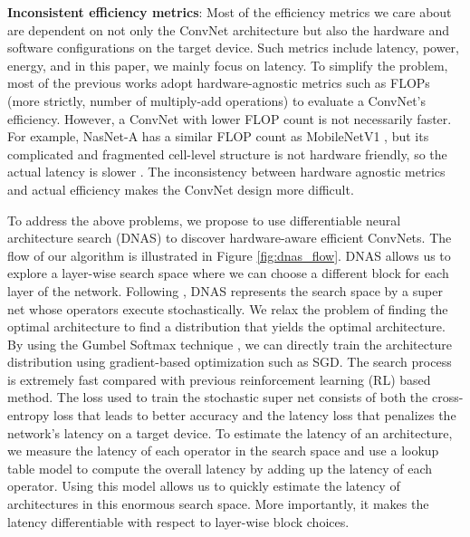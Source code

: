 \documentclass[10pt,twocolumn,letterpaper]{article}
\begin{document}
\textbf{Inconsistent efficiency metrics}: Most of the efficiency metrics we care about are dependent on not only the ConvNet architecture but also the hardware and software configurations on the target device. Such metrics include latency, power, energy, and in this paper, we mainly focus on latency. To simplify the problem, most of the previous works adopt hardware-agnostic metrics such as FLOPs (more strictly, number of multiply-add operations) to evaluate a ConvNet's efficiency. However, a ConvNet with lower FLOP count is not necessarily faster. For example, NasNet-A \cite{zoph2017learning} has a similar FLOP count as MobileNetV1 \cite{howard2017mobilenets}, but its complicated and fragmented cell-level structure is not hardware friendly, so the actual latency is slower \cite{sandler2018mobilenetv2}. The inconsistency between hardware agnostic metrics and actual efficiency makes the ConvNet design more difficult. 

To address the above problems, we propose to use differentiable neural architecture search (DNAS) to discover hardware-aware efficient ConvNets. The flow of our algorithm is illustrated in Figure \ref{fig:dnas_flow}. DNAS allows us to explore a layer-wise search space where we can choose a different block for each layer of the network. Following \cite{veniat2017learning}, DNAS represents the search space by a super net whose operators execute stochastically. We relax the problem of finding the optimal architecture to find a distribution that yields the optimal architecture. By using the Gumbel Softmax technique \cite{jang2016categorical}, we can directly train the architecture distribution using gradient-based optimization such as SGD. The search process is extremely fast compared with previous reinforcement learning (RL) based method. The loss used to train the stochastic super net consists of both the cross-entropy loss that leads to better accuracy and the latency loss that penalizes the network's latency on a target device. To estimate the latency of an architecture, we measure the latency of each operator in the search space and use a lookup table model to compute the overall latency by adding up the latency of each operator. Using this model allows us to quickly estimate the latency of architectures in this enormous search space. More importantly, it makes the latency differentiable with respect to layer-wise block choices. 
\end{document}
